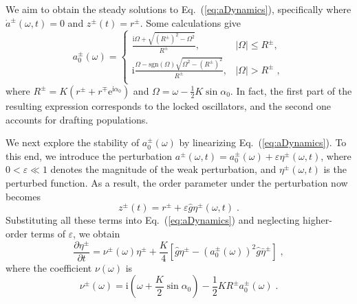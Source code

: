 \documentclass{article}
\begin{document}
We aim to obtain the steady solutions to Eq.~(\ref{eq:aDynamics}), specifically where $\dot{a}^{\pm}\left(\omega, t\right)=0$ and $z^{\pm}\left(t\right)=r^{\pm}$. 
Some calculations give
\begin{equation}
    \label{eq:steadyState}
    a_{0}^{\pm}\left( \omega \right) =\begin{cases}
        \frac{\mathrm{i}\Omega +\sqrt{\left( R^{\pm} \right) ^2-\Omega ^2}}{R^{\pm}},&		\left| \Omega \right|\leqslant R^{\pm},\;\\
        \mathrm{i}\frac{\Omega -\text{sgn} \left( \Omega \right) \sqrt{\Omega ^2-\left( R^{\pm} \right) ^2}}{R^{\pm}},&		\left| \Omega \right|>R^{\pm}\;,\\
    \end{cases}
\end{equation}
where $R^{\pm}=K\left(r^{\pm}+r^{\mp}\mathrm{e}^{\mathrm{i}\alpha_0}\right)$ and $\Omega=\omega-\frac{1}{2}K\sin\alpha_0$.  
In fact, the first part of the resulting expression corresponds to the locked oscillators, and the second one accounts for drafting populations.

We next explore the stability of $a_{0}^{\pm}\left( \omega \right)$ by linearizing Eq.~(\ref{eq:aDynamics}).
To this end, we introduce the perturbation $a^{\pm}\left( \omega ,t \right) =a_{0}^{\pm}\left( \omega \right) +\varepsilon \eta^{\pm} \left( \omega ,t \right)$, where $0 < \varepsilon \ll 1$ denotes the magnitude of the weak perturbation, and $\eta^{\pm} \left( \omega ,t \right)$ is the perturbed function.
As a result, the order parameter under the perturbation now becomes
\begin{equation}
    z^{\pm}\left( t \right) =r^{\pm}+\varepsilon \hat{g}\eta^{\pm} \left( \omega ,t \right)\;.
\end{equation}
Substituting all these terms into Eq.~(\ref{eq:aDynamics}) and neglecting higher-order terms of $\varepsilon$, we obtain
\begin{equation}
    \label{eq:etaDynamics}
    \frac{\partial \eta ^{\pm}}{\partial t}=\nu^{\pm} \left( \omega \right) \eta ^{\pm}+\frac{K}{4}\left[ \hat{g}\eta^{\pm} -\left( a_{0}^{\pm}\left( \omega \right) \right) ^2\hat{g}\bar{\eta}^{\pm} \right] \;,
\end{equation}
where the coefficient $\nu \left( \omega \right)$ is
\begin{equation}
    \nu ^{\pm}\left( \omega \right) =\text{i}\left( \omega +\frac{K}{2}\sin \alpha _0 \right) -\frac{1}{2}KR^{\pm}a_{0}^{\pm}\left( \omega \right) \;.
\end{equation}
\end{document}
